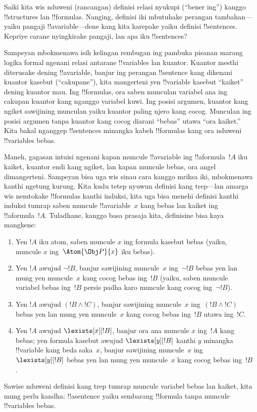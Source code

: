 \documentclass[../../../include/open-logic-section]{subfiles}
\begin{document}


Saiki kita wis nduweni (rancangan) definisi relasi nyukupi (``bener
ing'') kanggo !!{structure}s lan !!{formula}s. Nanging, definisi iki
mbutuhake perangan tambahan---yaiku pangaji !!a{variable}---dene kang
kita karepake yaiku definisi !!{sentence}s. Kepriye carane nyingkirake
pangaji, lan apa iku !!{sentence}s?

Sampeyan mbokmenawa isih kelingan rembugan ing pambuka pisanan marang
logika formal ngenani relasi antarane !!{variable}s lan kuantor. Kuantor
mesthi diterusake dening !!a{variable}, banjur ing perangan
!!{sentence} kang dikenani kuantor kasebut (``cakupane''), kita
mangerteni yen !!{variable} kasebut ``kaiket'' dening kuantor mau. Ing
!!{formula}s, ora saben munculan variabel ana ing cakupan kuantor
kang nganggo variabel kuwi. Ing posisi argumen, kuantor kang ngiket sawijining munculan yaiku kuantor paling njero
kang cocog. Munculan ing posisi argumen tanpa kuantor kang cocog
diarani “bebas” utawa “ora kaiket.” Kita bakal nganggep !!{sentence}s minangka kabeh !!{formula}s
kang ora nduweni !!{variable}s bebas.

Maneh, gagasan intuisi ngenani kapan muncule !!a{variable} ing
!!a{formula}~$!A$ iku kaiket, kuantor endi kang ngiket, lan kapan
muncule bebas, ora angel dimangerteni. Sampeyan bisa uga wis sinau cara
kanggo mriksa iki, mbokmenawa kanthi ngetung kurung. Kita kudu tetep
nyuwun definisi kang trep---lan amarga wis nemtokake !!{formula}s kanthi
induksi, kita uga bisa menehi definisi kanthi induksi tumrap saben
muncule !!a{variable}~$x$ kang bebas lan kaiket ing
!!a{formula}~$!A$. Tuladhane, kanggo basa prasaja kita, definisine bisa
kaya mangkene:
\begin{enumerate}
  \item Yen $!A$ iku atom, saben muncule $x$ ing formula kasebut bebas
  (yaiku, muncule $x$ ing~$\Atom{\Obj P}{x}$ iku bebas).
  \item Yen $!A$ awujud $\lnot !B$, banjur sawijining muncule~$x$
  ing~$\lnot !B$ bebas yen lan mung yen muncule~$x$ kang cocog bebas
  ing~$!B$ (yaiku, saben muncule variabel bebas ing~$
  !B$ persis padha karo muncule kang cocog ing~$\lnot !B$).
  \item Yen $!A$ awujud $(!B \land !C)$, banjur sawijining muncule~$x$
  ing~$(!B \land !C)$ bebas yen lan mung yen muncule~$x$ kang cocog
  bebas ing~$!B$ utawa ing~$!C$.
  \item Yen $!A$ awujud $\lexists[x][!B]$, banjur ora ana muncule
  $x$ ing~$!A$ kang bebas; yen formula kasebut awujud $\lexists[y][!B]$ kanthi
  $y$ minangka !!{variable} kang beda saka~$x$, banjur sawijining
  muncule~$x$ ing $\lexists[y][!B]$ bebas yen lan mung yen muncule~$x$
  kang cocog bebas ing~$!B$.
\end{enumerate}

Sawise nduweni definisi kang trep tumrap muncule variabel bebas lan
kaiket, kita mung perlu kandha: !!a{sentence} yaiku sembarang
!!{formula} tanpa muncule !!{variable}s bebas.
\end{document}
